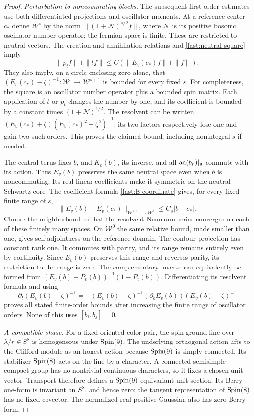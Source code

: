 \begin{proof}
\smallskip\noindent\emph{Perturbation to noncommuting blocks.}
The subsequent first-order estimates use both differentiated projections
and oscillator moments. At a reference center $c_*$ define
$\mathcal W^s$ by the norm
$\|(1+\mathcal N)^{s/2}f\|$, where $\mathcal N$ is its positive
bosonic oscillator number operator; the fermion space is finite.
These are restricted to neutral vectors. The creation and
annihilation relations and \eqref{fast:neutral-square} imply
\[
 \|p_tf\|+\|tf\|\leq C(\|E_v(c_*)f\|+\|f\|).
\]
They also imply, on a circle enclosing zero alone, that
$(E_v(c_*)-\zeta)^{-1}:\mathcal W^s\to\mathcal W^{s+1}$ is bounded
for every fixed $s$. For completeness, the square is an oscillator
number operator plus a bounded spin matrix. Each application of
$t$ or $p_t$ changes the number by one, and its coefficient is bounded
by a constant times $(1+\mathcal N)^{1/2}$. The resolvent can be
written $(E_v(c_*)+\zeta)(E_v(c_*)^2-\zeta^2)^{-1}$; its two factors
respectively lose one and gain two such orders. This proves the
claimed bound, including nonintegral $s$ if needed.

The central torus fixes $b$, and $K_e(b)$, its inverse, and all
$\operatorname{ad}(b_r)|_{\mathfrak n}$ commute with its action. Thus $E_v(b)$ preserves
the same neutral space even when $b$ is noncommuting. Its real linear
coefficients make it symmetric on the neutral Schwartz core.
The coefficient formula \eqref{fast:E-coordinate} gives, for every
fixed finite range of $s$,
\[
 \|E_v(b)-E_v(c_*)\|_{\mathcal W^{s+1}\to\mathcal W^s}
 \leq C_s|b-c_*|.
\]
Choose the neighborhood so that the resolvent Neumann series
converges on each of these finitely many spaces. On $\mathcal W^0$
the same relative bound, made smaller than one, gives self-adjointness
on the reference domain. The contour projection has constant rank
one. It commutes with parity, and its range remains entirely even by
continuity. Since $E_v(b)$ preserves this range and reverses parity,
its restriction to the range is zero. The complementary
inverse can equivalently be formed from
$(E_v(b)+P_v(b))^{-1}(1-P_v(b))$. Differentiating its resolvent
formula and using
\[
 \partial_b(E_v(b)-\zeta)^{-1}
 =-(E_v(b)-\zeta)^{-1}(\partial_bE_v(b))
                         (E_v(b)-\zeta)^{-1}
\]
proves all stated finite-order bounds after increasing the finite
range of oscillator orders. None of this uses $[b_i,b_j]=0$.

\smallskip\noindent\emph{A compatible phase.}
For a fixed oriented color pair, the
spin ground line over $\lambda/r\in S^8$ is homogeneous under
$\operatorname{Spin}(9)$. The underlying orthogonal action lifts to the Clifford module
as an honest action because $\operatorname{Spin}(9)$ is simply connected.
Its stabilizer $\operatorname{Spin}(8)$ acts on the line by a character.
A connected semisimple compact group has no nontrivial continuous
characters, so it fixes a chosen unit vector. Transport therefore
defines a $\operatorname{Spin}(9)$-equivariant unit section. Its Berry one-form is
invariant on $S^8$, and hence zero: the tangent representation of
$\operatorname{Spin}(8)$ has no fixed covector. The normalized real positive
Gaussian also has zero Berry form.


\end{proof}
